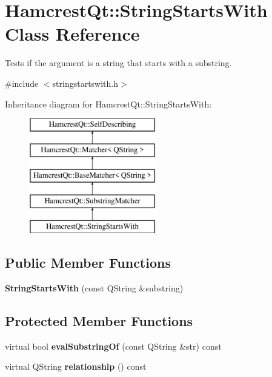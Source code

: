 \hypertarget{class_hamcrest_qt_1_1_string_starts_with}{\section{Hamcrest\-Qt\-:\-:String\-Starts\-With Class Reference}
\label{class_hamcrest_qt_1_1_string_starts_with}
}


Tests if the argument is a string that starts with a substring.  




{\ttfamily \#include $<$stringstartswith.\-h$>$}

Inheritance diagram for Hamcrest\-Qt\-:\-:String\-Starts\-With\-:\begin{figure}[H]
\begin{center}
\leavevmode
\includegraphics[height=5.000000cm]{class_hamcrest_qt_1_1_string_starts_with}
\end{center}
\end{figure}
\subsection*{Public Member Functions}
\begin{DoxyCompactItemize}
\item 
\hypertarget{class_hamcrest_qt_1_1_string_starts_with_a5b7e2876a5eba8a0217668d9557ad207}{{\bfseries String\-Starts\-With} (const Q\-String \&substring)}\label{class_hamcrest_qt_1_1_string_starts_with_a5b7e2876a5eba8a0217668d9557ad207}

\end{DoxyCompactItemize}
\subsection*{Protected Member Functions}
\begin{DoxyCompactItemize}
\item 
\hypertarget{class_hamcrest_qt_1_1_string_starts_with_a828dbdcea8bb9910c178bd65473f9451}{virtual bool {\bfseries eval\-Substring\-Of} (const Q\-String \&str) const }\label{class_hamcrest_qt_1_1_string_starts_with_a828dbdcea8bb9910c178bd65473f9451}

\item 
\hypertarget{class_hamcrest_qt_1_1_string_starts_with_ad06efdaa236c839403a7843779924e02}{virtual Q\-String {\bfseries relationship} () const }\label{class_hamcrest_qt_1_1_string_starts_with_ad06efdaa236c839403a7843779924e02}

\end{DoxyCompactItemize}
